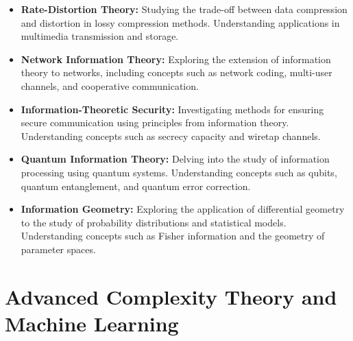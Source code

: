 \documentclass[openany]{book}
\begin{document}
\begin{itemize}
    \item \textbf{Rate-Distortion Theory:} Studying the trade-off between data compression and distortion in lossy compression methods. Understanding applications in multimedia transmission and storage.
    \item \textbf{Network Information Theory:} Exploring the extension of information theory to networks, including concepts such as network coding, multi-user channels, and cooperative communication.
    \item \textbf{Information-Theoretic Security:} Investigating methods for ensuring secure communication using principles from information theory. Understanding concepts such as secrecy capacity and wiretap channels.
    \item \textbf{Quantum Information Theory:} Delving into the study of information processing using quantum systems. Understanding concepts such as qubits, quantum entanglement, and quantum error correction.
    \item \textbf{Information Geometry:} Exploring the application of differential geometry to the study of probability distributions and statistical models. Understanding concepts such as Fisher information and the geometry of parameter spaces.
\end{itemize}
\section{Advanced Complexity Theory and Machine Learning}
\end{document}
